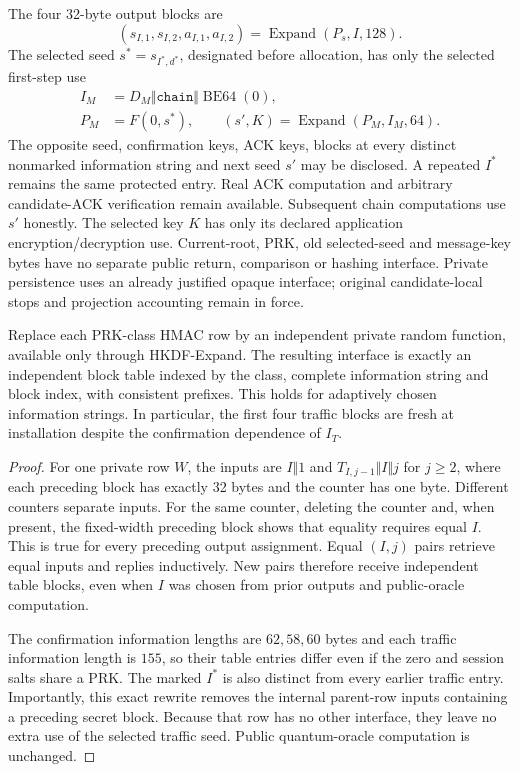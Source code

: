 The four 32-byte output blocks are
\[
 (s_{I,1},s_{I,2},a_{I,1},a_{I,2})
 =\operatorname{Expand}(P_s,I,128).
\]
The selected seed $s^*=s_{I^*,d^*}$, designated before allocation,
has only the selected first-step use
\begin{equation}
 \begin{split}
 I_M&=D_M\Vert\texttt{chain}\Vert\operatorname{BE64}(0),\\
 P_M&=F(0,s^*),\qquad
 (s',K)=\operatorname{Expand}(P_M,I_M,64).
 \end{split}
 \label{eq:joint-chain-step}
\end{equation}
The opposite seed, confirmation keys, ACK keys, blocks at every distinct
nonmarked information string and next seed $s'$ may be disclosed.
A repeated $I^*$ remains the same protected entry.
Real ACK computation and arbitrary candidate-ACK verification
remain available. Subsequent chain computations use $s'$ honestly.
The selected key $K$ has only its declared application encryption/decryption
use. Current-root, PRK, old selected-seed and message-key bytes have no
separate public return, comparison or hashing interface. Private persistence
uses an already justified opaque interface; original candidate-local stops
and projection accounting remain in force.

\begin{lemma}
\label{lem:joint-expand-blocks}
Replace each PRK-class HMAC row by an independent private random function,
available only through HKDF-Expand. The resulting interface is exactly an
independent block table indexed by the class, complete information string
and block index, with consistent prefixes. This holds for adaptively
chosen information strings. In particular, the first four traffic blocks
are fresh at installation despite the confirmation dependence of $I_T$.
\end{lemma}
\begin{proof}
For one private row $W$, the inputs are
$I\Vert1$ and $T_{I,j-1}\Vert I\Vert j$ for $j\ge2$, where each preceding
block has exactly 32 bytes and the counter has one byte. Different counters
separate inputs. For the same counter, deleting the counter and, when
present, the fixed-width preceding block shows that equality requires equal
$I$. This is true for every preceding output assignment. Equal $(I,j)$
pairs retrieve equal inputs and replies inductively. New pairs therefore
receive independent table blocks, even when $I$ was chosen from prior
outputs and public-oracle computation.

The confirmation information lengths are $62,58,60$ bytes and each traffic
information length is $155$, so their table entries differ even if the
zero and session salts share a PRK. The marked $I^*$ is also distinct from
every earlier traffic entry. Importantly, this exact rewrite removes
the internal parent-row inputs containing a preceding secret block.
Because that row has no other interface, they leave no extra use of the
selected traffic seed. Public quantum-oracle computation is unchanged.
\end{proof}

